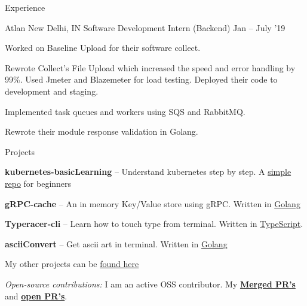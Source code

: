 \documentclass{resume} %
\begin{document}
\begin{rSection}{Experience}
  \begin{rWorkSection}{Atlan}
                     {New Delhi, IN}
                     {Software Development Intern (Backend)}
                     {Jan -- July '19}
  {
    \item Worked on Baseline Upload for their software collect. 
    \item Rewrote Collect's File Upload which increased the speed and error handling by 99\%. Used Jmeter and Blazemeter for load testing. Deployed their code to development and staging.
    \item Implemented task queues and workers using SQS and RabbitMQ.
    \item Rewrote their module response validation in Golang.
  }
  \end{rWorkSection}
\end{rSection}


\begin{rSection}{Projects}
  \begin{rProjectSection}
    \item \textbf {kubernetes-basicLearning} -- Understand kubernetes step by step. A \href{https://github.com/knrt10/kubernetes-basicLearning/}{simple repo} for beginners
    \item \textbf {gRPC-cache} -- An in memory Key/Value store using gRPC. Written in \href{https://github.com/knrt10/gRPC-cache}{Golang}
    \item \textbf {Typeracer-cli} -- Learn how to touch type from terminal. Written in \href{https://github.com/p-society/typeracer-cli/}{TypeScript}.
    \item \textbf {asciiConvert} -- Get ascii art in terminal. Written in \href{https://github.com/knrt10/asciiConvert/}{Golang}
    \item My other projects can be \href{https://knrt10.github.io/projects/}{found here}
  \end{rProjectSection}

  \begin{rBlurbSection}
    \item {\em Open-source contributions:}
      I am an active OSS contributor. My \href{http://bit.ly/2kdr9Ui}{\textbf{Merged PR's}} and \href{http://bit.ly/2kxjvV9}{\textbf{open PR's}}.
  \end{rBlurbSection}
\end{rSection}
\end{document}
